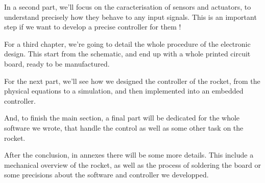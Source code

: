 In a second part, we'll focus on the caracterisation of sensors and actuators,
to understand precisely how they behave to any input signals. This is an
important step if we want to develop a precise controller for them !

For a third chapter, we're going to detail the whole procedure of the
electronic design. This start from the schematic, and end up with a whole
printed circuit board, ready to be manufactured.

For the next part, we'll see how we designed the controller of the rocket, from
the physical equations to a simulation, and then implemented into an embedded
controller.

And, to finish the main section, a final part will be dedicated for the whole
software we wrote, that handle the control as well as some other task on the
rocket.

After the conclusion, in annexes there will be some more details. This include
a mechanical overview of the rocket, as well as the process of soldering the
board or some precisions about the software and controller we developped.

